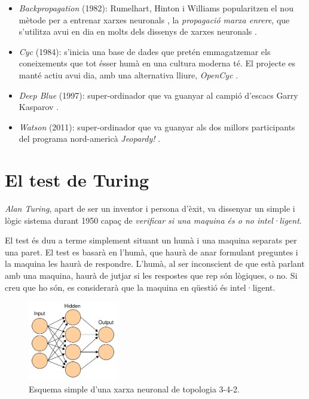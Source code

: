 \begin{itemize}
\item \emph{Backpropagation} (1982): Rumelhart, Hinton i Williams popularitzen el nou mètode per a entrenar xarxes neuronals \cite{mlintro}, la \emph{propagació marxa enrere}, que s'utilitza avui en dia en molts dels dissenys de xarxes neuronals \cite{mlalgo09}.
\item \emph{Cyc} (1984): s'inicia una base de dades que pretén emmagatzemar els coneixements que tot ésser humà en una cultura moderna té. El projecte es manté actiu avui dia, amb una alternativa lliure, \emph{OpenCyc} \cite{opencyc}.
\item \emph{Deep Blue} (1997): super-ordinador que va guanyar al campió d'escacs Garry Kasparov \cite{deepblue}.
\item \emph{Watson} (2011): super-ordinador que va guanyar als dos millors participants del programa nord-americà \emph{Jeopardy!} \cite{watsonjeopardy}.
\end{itemize}

\section{El test de Turing}

\emph{Alan Turing}, apart de ser un inventor i persona d'èxit, va dissenyar un simple i lògic sistema durant 1950 capaç de \emph{verificar si una maquina és o no intel·ligent}.

El test és duu a terme simplement situant un humà i una maquina separats per una paret. El test es basarà en l'humà, que haurà de anar formulant preguntes i la maquina les haurà de respondre. L'humà, al ser inconscient de que està parlant amb una maquina, haurà de jutjar si les respostes que rep són lògiques, o no. Si creu que ho són, es considerarà que la maquina en qüestió és intel·ligent. \cite{TurTest}

\begin{figure}[ht!]
\centering
\includegraphics[height=35mm]{data/nn.png}
\caption{Esquema simple d'una xarxa neuronal de topologia 3-4-2.}
\label{websshare}
\end{figure} 
